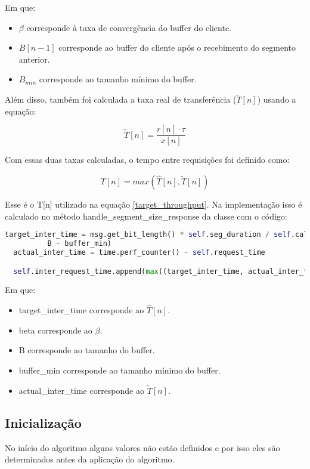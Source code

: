\documentclass[10pt,twocolumn,letterpaper]{article}
\begin{document}
Em que:
\begin{itemize}
 \item $\beta$ corresponde à taxa de convergência do buffer do cliente.
 \item $B[n-1]$ corresponde ao buffer do cliente após o recebimento do segmento anterior.
 \item $B_{min}$ corresponde ao tamanho mínimo do buffer.
\end{itemize}

Além disso, também foi calculada a taxa real de transferência ($\tilde{T}[n]$) usando a equação:

\begin{equation}
  \tilde{T}[n] = \frac{r[n] \cdot \tau}{x[n]}
\end{equation}

Com essas duas taxas calculadas, o tempo entre requisições foi definido como:

\begin{equation}
  T[n] = max(\hat{T}[n], \tilde{T}[n])
\end{equation}

Esse é o T[n] utilizado na equação \ref{target_throughput}. Na implementação isso é calculado no método handle\_segment\_size\_response da classe com o código:

\begin{lstlisting}[language=python]
  target_inter_time = msg.get_bit_length() * self.seg_duration / self.calc_throughputs[-1] + beta * (
          B - buffer_min)
  actual_inter_time = time.perf_counter() - self.request_time

  self.inter_request_time.append(max((target_inter_time, actual_inter_time))) 
\end{lstlisting}

Em que:

\begin{itemize}
  \item target\_inter\_time corresponde ao $\hat{T}[n]$.
  \item beta corresponde ao $\beta$.
  \item B corresponde ao tamanho do buffer.
  \item buffer\_min corresponde ao tamanho mínimo do buffer.
  \item actual\_inter\_time corresponde ao $\tilde{T}[n]$.
\end{itemize}

\subsection{Inicialização}
No início do algoritmo alguns valores não estão definidos e por isso eles são determinados antes da aplicação do algoritmo.
\end{document}
